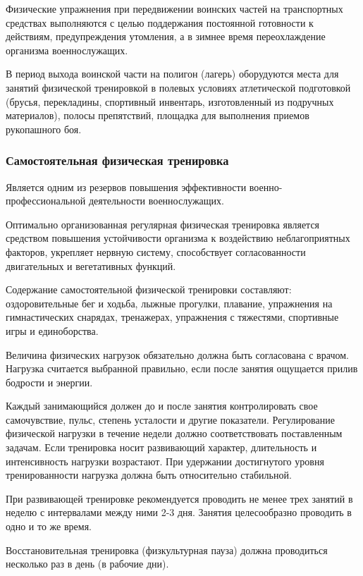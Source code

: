 \documentclass[a4paper]{article}
\begin{document}
    Физические упражнения при передвижении воинских частей на транспортных средствах выполняются с целью поддержания постоянной готовности к действиям, предупреждения утомления, а в зимнее время переохлаждение организма военнослужащих.

    В период выхода воинской части на полигон (лагерь) оборудуются места для занятий физической тренировкой в полевых условиях атлетической подготовкой (брусья, перекладины, спортивный инвентарь, изготовленный из подручных материалов), полосы препятствий, площадка для выполнения приемов рукопашного боя.

    \subsubsection{Самостоятельная физическая тренировка}

    Является одним из резервов повышения эффективности военно-профессиональной деятельности военнослужащих.

    Оптимально организованная регулярная физическая тренировка является средством повышения устойчивости организма к воздействию неблагоприятных факторов, укрепляет нервную систему, способствует согласованности двигательных и вегетативных функций.

    Содержание самостоятельной физической тренировки составляют: оздоровительные бег и ходьба, лыжные прогулки, плавание, упражнения на гимнастических снарядах, тренажерах, упражнения с тяжестями, спортивные игры и единоборства.

    Величина физических нагрузок обязательно должна быть согласована с врачом. Нагрузка считается выбранной правильно, если после занятия ощущается прилив бодрости и энергии.

    Каждый занимающийся должен до и после занятия контролировать свое самочувствие, пульс, степень усталости и другие показатели. Регулирование физической нагрузки в течение недели должно соответствовать поставленным задачам. Если тренировка носит развивающий характер, длительность и интенсивность нагрузки возрастают. При удержании достигнутого уровня тренированности нагрузка должна быть относительно стабильной.

    При развивающей тренировке рекомендуется проводить не менее трех занятий в неделю с интервалами между ними 2-3 дня. Занятия целесообразно проводить в одно и то же время.

    Восстановительная тренировка (физкультурная пауза) должна проводиться несколько раз в день (в рабочие дни).
\end{document}

